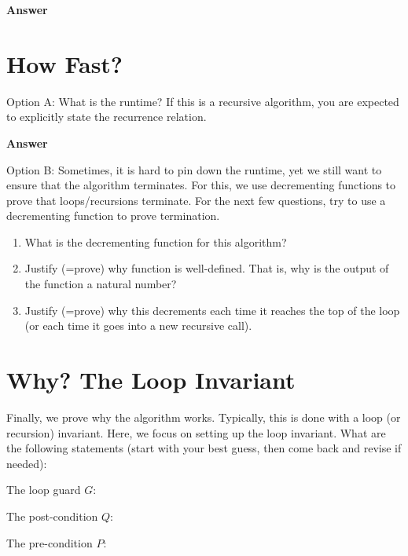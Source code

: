 \documentclass{article}
\begin{document}
\textbf{Answer}
\vspace{3in}


\pagebreak
\section{How Fast?}

Option A: What is the runtime?  If this is a recursive algorithm, you are expected to
explicitly state the recurrence relation.

\textbf{Answer}
\vspace{1in}

Option B: Sometimes, it is hard to pin down the runtime, yet we still want to ensure that
the algorithm terminates.  For this, we use decrementing functions to prove that
loops/recursions terminate.  For the next few questions, try to use a
decrementing function to prove termination.

\begin{enumerate}
    \item What is the decrementing function for this algorithm?
    \practice

    \item Justify (=prove) why function is well-defined.  That is, why is the
        output of the function a natural number?
    \practice

    \item     Justify (=prove) why this decrements each time it reaches the top
        of the loop (or each time it goes into a new recursive call).
    \practice

\end{enumerate}


\pagebreak
\section{Why? The Loop Invariant}

Finally, we prove why the algorithm works.  Typically, this is done with a loop
(or recursion) invariant.  Here, we focus on setting up the loop invariant.
What
are the following statements (start with your best guess, then come back and
revise if needed):

The loop guard $G$:
\vspace{0.5in}

The post-condition $Q$:
\vspace{0.5in}

The pre-condition $P$:
\vspace{0.5in}
\end{document}

